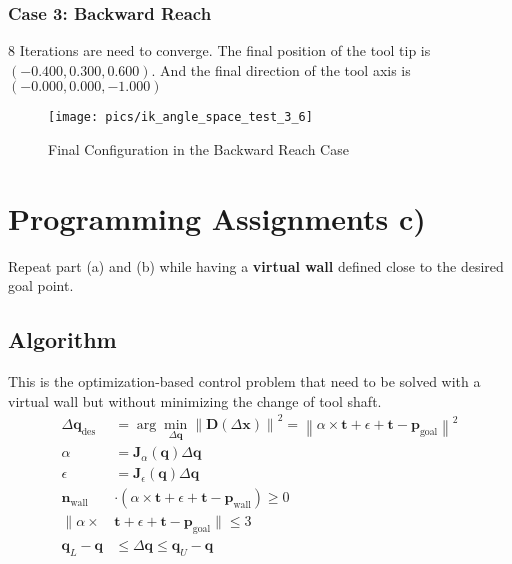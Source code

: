 \documentclass[english,10pt,a4paper]{book}
\begin{document}
		\subsubsection{Case 3: Backward Reach}
		8 Iterations are need to converge. The final position of the tool tip is \((-0.400, 0.300, 0.600)\). And the final direction of the tool axis is \((-0.000, 0.000, -1.000)\)
		\begin{figure}[H]
			\centering
			\texttt{[image: pics/ik\_angle\_space\_test\_3\_6]}
			\caption{Final Configuration in the Backward Reach Case}
		\end{figure}
		\section{Programming Assignments c)}
		Repeat part (a) and (b) while having a \textbf{virtual wall} defined close to the desired goal point.
		\subsection{Algorithm}
		This is the optimization-based control problem that need to be solved with a virtual wall but without minimizing the change of tool shaft.
		\begin{equation}\label{noaxis}
			\begin{aligned}
				\Delta \mathbf{q}_{\text{des}} &= \arg \min_{\Delta \mathbf{q}} \left\| \mathbf{D}(\Delta \mathbf{x}) \right\|^2 = \left\| \alpha \times \mathbf{t} + \epsilon + \mathbf{t} - \mathbf{p}_{\text{goal}} \right\|^2\\
				\alpha &= \mathbf{J}_{\alpha}(\mathbf{q}) \Delta \mathbf{q} \\
				\epsilon &= \mathbf{J}_{\epsilon}(\mathbf{q}) \Delta \mathbf{q} \\
				\mathbf{n}_{\text{wall}} & \cdot( \alpha \times \mathbf{t} + \epsilon + \mathbf{t} - \mathbf{p}_{\text{wall}}) \ge 0 \\
				\| \alpha \times &\mathbf{t} + \epsilon + \mathbf{t} - \mathbf{p}_{\text{goal}} \| \leq 3 \\
				\mathbf{q}_L - \mathbf{q} &\leq \Delta \mathbf{q} \leq \mathbf{q}_U - \mathbf{q}
			\end{aligned}
		\end{equation}
		
\end{document}
